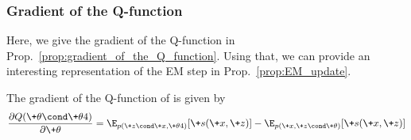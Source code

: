 \documentclass{article} %
\newcommand{\sufficientStatsFunction}{\+s}
\newcommand{\param}{\+\theta}
\begin{document}
    



\subsubsection{Gradient of the Q-function}

 Here, we give the gradient of the Q-function in Prop.~\ref{prop:gradient_of_the_Q_function}. Using that, we can provide an interesting representation of the EM step  in Prop.~\ref{prop:EM_update}. 


\begin{proposition}
 The gradient of the Q-function of 
is given by 
 \begin{align}
 \frac{\partial Q(\param \cond \param^^t)}{\partial \param} =  \E_{p(\+z \cond \+x, \param^^t)}[\sufficientStatsFunction(\+x,\+z)] - 	\E_{p(\+x, \+z \cond \param)}[\sufficientStatsFunction(\+x,\+z)]
 \label{eqn:gradient_of_Q_function_for_EM}
 \end{align}
%
\label{prop:gradient_of_the_Q_function}
 \end{proposition}
\end{document}
